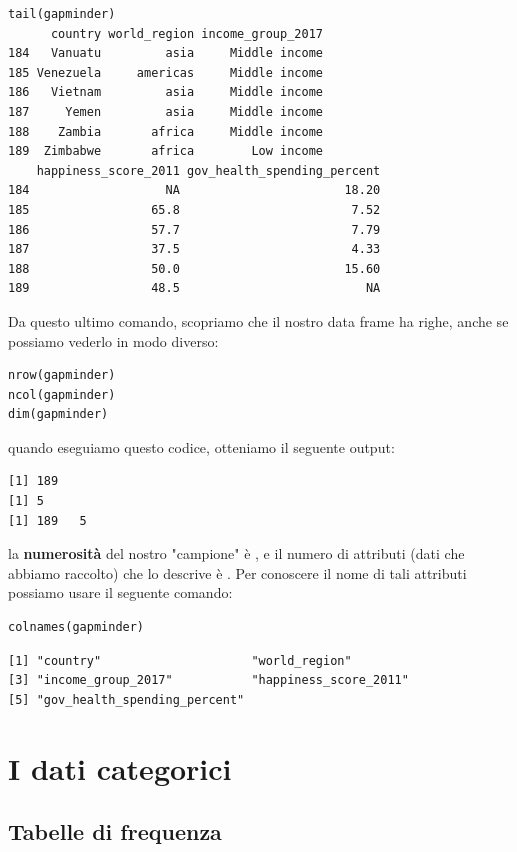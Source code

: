 \begin{lstlisting}[style=Rstyle]
tail(gapminder)
      country world_region income_group_2017
184   Vanuatu         asia     Middle income
185 Venezuela     americas     Middle income
186   Vietnam         asia     Middle income
187     Yemen         asia     Middle income
188    Zambia       africa     Middle income
189  Zimbabwe       africa        Low income
    happiness_score_2011 gov_health_spending_percent
184                   NA                       18.20
185                 65.8                        7.52
186                 57.7                        7.79
187                 37.5                        4.33
188                 50.0                       15.60
189                 48.5                          NA
\end{lstlisting}
%
Da questo ultimo comando, scopriamo che il nostro data frame ha  righe, anche se possiamo vederlo in modo diverso:

\begin{lstlisting}[style=Rstylescript]
nrow(gapminder)
ncol(gapminder)
dim(gapminder)
\end{lstlisting}
%	
quando eseguiamo questo codice, otteniamo il seguente output:

\begin{lstlisting}[style=Rstyle]
[1] 189
[1] 5
[1] 189   5
\end{lstlisting}
%
la \textbf{numerosit\`a} del nostro "campione" \`e , e il numero di attributi (dati che abbiamo raccolto) che lo descrive \`e . Per conoscere il nome di tali attributi possiamo usare il seguente comando:


\begin{lstlisting}[style=Rstylescript]
colnames(gapminder)
\end{lstlisting}

\begin{lstlisting}[style=Rstyle]
[1] "country"                     "world_region"
[3] "income_group_2017"           "happiness_score_2011"
[5] "gov_health_spending_percent"
\end{lstlisting}


\section{I dati categorici}

\subsection{Tabelle di frequenza}

